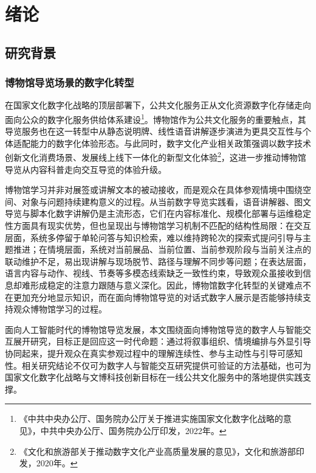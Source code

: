\chapter{绪论}

\section{研究背景}

\subsection{博物馆导览场景的数字化转型}
在国家文化数字化战略的顶层部署下，公共文化服务正从文化资源数字化存储走向面向公众的数字化服务供给体系建设\footnote{《中共中央办公厅、国务院办公厅关于推进实施国家文化数字化战略的意见》，中共中央办公厅、国务院办公厅印发，2022年。}。博物馆作为公共文化服务的重要触点，其导览服务也在这一转型中从静态说明牌、线性语音讲解逐步演进为更具交互性与个体适配能力的数字化体验形态。与此同时，数字文化产业相关政策强调以数字技术创新文化消费场景、发展线上线下一体化的新型文化体验\footnote{《文化和旅游部关于推动数字文化产业高质量发展的意见》，文化和旅游部印发，2020年。}，这进一步推动博物馆导览从内容科普走向交互导览的体验升级。

博物馆学习并非对展签或讲解文本的被动接收，而是观众在具体参观情境中围绕空间、对象与问题持续建构意义的过程\cite{falk2016,li2024,luo2024}。从当前数字导览实践看，语音讲解器、图文导览与脚本化数字讲解仍是主流形态，它们在内容标准化、规模化部署与运维稳定性方面具有现实优势，但也呈现出与博物馆学习机制不匹配的结构性局限：在交互层面，系统多停留于单轮问答与知识检索，难以维持跨轮次的探索式提问引导与主题推进\cite{duguleana2020,spiliotopoulos2020,varitimiadis2021}；在情境层面，系统对当前展品、当前位置、当前参观阶段与当前关注点的联动维护不足，易出现讲解与现场脱节、路径与理解不同步等问题\cite{hulusic2023,chin2023,tsitseklis2023}；在表达层面，语言内容与动作、视线、节奏等多模态线索缺乏一致性约束，导致观众虽接收到信息却难形成稳定的注意力跟随与意义深化\cite{noh2021,cantucci2022,vanderheiden2022}。因此，博物馆数字化转型的关键难点不在更加充分地显示知识，而在面向博物馆导览的对话式数字人展示是否能够持续支持观众博物馆学习的过程。

面向人工智能时代的博物馆导览发展，本文围绕面向博物馆导览的数字人与智能交互展开研究，目标正是回应这一时代命题：通过将叙事组织、情境编排与外显引导协同起来，提升观众在真实参观过程中的理解连续性、参与主动性与引导可感知性。相关研究结论不仅可为数字人与智能交互研究提供可验证的方法基础，也可为国家文化数字化战略与文博科技创新目标在一线公共文化服务中的落地提供实践支撑。

